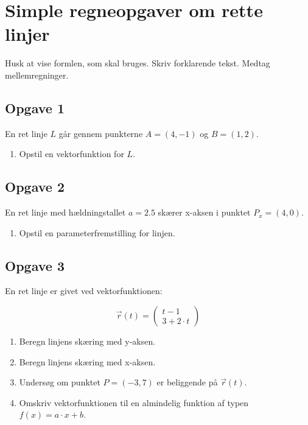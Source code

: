 \documentclass[a4paper, 12pt]{article}
\begin{document}
\section*{Simple regneopgaver om rette linjer}
\label{sec:orgad12cd7}

Husk at vise formlen, som skal bruges. Skriv forklarende tekst. Medtag mellemregninger.

\subsection*{Opgave 1}
\label{sec:org5de1516}

En ret linje \(L\) går gennem punkterne \(A=(4, -1)\) og \(B=(1, 2)\).

\begin{enumerate}
\item Opstil en vektorfunktion for \(L\).
\end{enumerate}

\subsection*{Opgave 2}
\label{sec:orgcbd92d2}

En ret linje med hældningstallet \(a=2.5\) skærer x-aksen i punktet \(P_x = (4, 0)\).

\begin{enumerate}
\item Opstil en parameterfremstilling for linjen.
\end{enumerate}


\subsection*{Opgave 3}
\label{sec:orge9c295e}
En ret linje er givet ved vektorfunktionen:

$$\vec{r}(t) = \begin{pmatrix} t -1 \\ 3 + 2\cdot t \end{pmatrix}$$

\begin{enumerate}
\item Beregn linjens skæring med y-aksen.
\item Beregn linjens skæring med x-aksen.
\item Undersøg om punktet \(P=(-3,7)\) er beliggende på \(\vec{r}(t)\).
\item Omskriv vektorfunktionen til en almindelig funktion af typen \(f(x) = a \cdot x + b\).
\end{enumerate}
\end{document}
